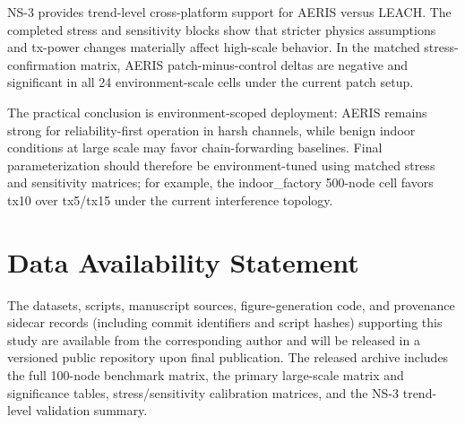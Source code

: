 ﻿\documentclass[sensors,article,submit,moreauthors,pdftex]{Definitions/mdpi}
\begin{document}
NS-3 provides trend-level cross-platform support for AERIS versus LEACH. The completed stress and sensitivity blocks show that stricter physics assumptions and tx-power changes materially affect high-scale behavior. In the matched stress-confirmation matrix, AERIS patch-minus-control deltas are negative and significant in all 24 environment-scale cells under the current patch setup.

The practical conclusion is environment-scoped deployment: AERIS remains strong for reliability-first operation in harsh channels, while benign indoor conditions at large scale may favor chain-forwarding baselines. Final parameterization should therefore be environment-tuned using matched stress and sensitivity matrices; for example, the indoor\_factory 500-node cell favors tx10 over tx5/tx15 under the current interference topology.

\section*{Data Availability Statement}
The datasets, scripts, manuscript sources, figure-generation code, and provenance sidecar records (including commit identifiers and script hashes) supporting this study are available from the corresponding author and will be released in a versioned public repository upon final publication. The released archive includes the full 100-node benchmark matrix, the primary large-scale matrix and significance tables, stress/sensitivity calibration matrices, and the NS-3 trend-level validation summary.


\end{document}
